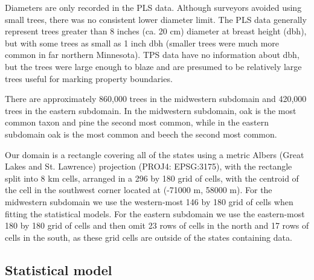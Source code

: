 \documentclass[10pt,letterpaper]{article}
\begin{document}
Diameters are only recorded in the PLS data. Although surveyors avoided
using small trees, there was no consistent lower diameter limit. The
PLS data generally represent trees greater than 8 inches (ca. 20
cm) diameter at breast height (dbh), but with some trees as small
as 1 inch dbh (smaller trees were much more common in far northern
Minnesota). TPS data have no information about dbh, but the trees
were large enough to blaze and are presumed to be relatively large
trees useful for marking property boundaries.

There are approximately 860,000 trees in the midwestern subdomain
and 420,000 trees in the eastern subdomain. In the midwestern subdomain,
oak is the most common taxon and pine the second most common, while
in the eastern subdomain oak is the most common and beech the second
most common.

Our domain is a rectangle covering all of the states using a metric
Albers (Great Lakes and St. Lawrence) projection (PROJ4: EPSG:3175),
with the rectangle split into 8 km cells, arranged in a 296 by 180
grid of cells, with the centroid of the cell in the southwest corner
located at (-71000 m, 58000 m). For the midwestern subdomain we use
the western-most 146 by 180 grid of cells when fitting
the statistical models. For the eastern subdomain we use the eastern-most
180 by 180 grid of cells and then omit 23 rows of cells in the north
and 17 rows of cells in the south, as these grid cells are outside
of the states containing data.



\subsection*{Statistical model\label{sec:Statistical-model}}
\end{document}
